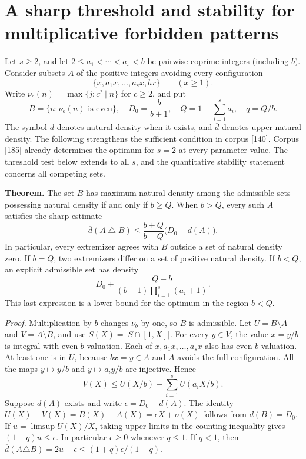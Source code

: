 \documentclass[11pt]{article}
\begin{document}
\clearpage

\section{A sharp threshold and stability for multiplicative forbidden patterns}
Let $s\ge2$, and let $2\le a_1<\cdots<a_s<b$ be pairwise coprime integers (including $b$). Consider subsets $A$ of the positive integers avoiding every configuration
\[
 \{x,a_1x,\ldots,a_sx,bx\}\qquad(x\ge1).
\]
Write $\nu_c(n)=\max\{j:c^j\mid n\}$ for $c\ge2$, and put
\[
 B=\{n:\nu_b(n)\text{ is even}\},\quad D_0=\frac{b}{b+1},\quad
 Q=1+\sum_{i=1}^s a_i,\quad q=Q/b.
\]
The symbol $d$ denotes natural density when it exists, and $\overline d$ denotes upper natural density. The following strengthens the sufficient condition in corpus [140]. Corpus [185] already determines the optimum for $s=2$ at every parameter value. The threshold test below extends to all $s$, and the quantitative stability statement concerns all competing sets.
\par\medskip\noindent\textbf{Theorem.}
The set $B$ has maximum natural density among the admissible sets possessing natural density if and only if $b\ge Q$. When $b>Q$, every such $A$ satisfies the sharp estimate
\[
 \overline d(A\mathbin{\triangle}B)\le
 \frac{b+Q}{b-Q}\bigl(D_0-d(A)\bigr).
\]
In particular, every extremizer agrees with $B$ outside a set of natural density zero. If $b=Q$, two extremizers differ on a set of positive natural density. If $b<Q$, an explicit admissible set has density
\[
 D_0+\frac{Q-b}{(b+1)\prod_{i=1}^s(a_i+1)}.
\]
This last expression is a lower bound for the optimum in the region $b<Q$.
\par\medskip\noindent\emph{Proof.}
Multiplication by $b$ changes $\nu_b$ by one, so $B$ is admissible.
Let $U=B\setminus A$ and $V=A\setminus B$, and use $S(X)=|S\cap[1,X]|$.
For every $y\in V$, the value $x=y/b$ is integral with even $b$-valuation. Each of $x,a_1x,\ldots,a_sx$ also has even $b$-valuation. At least one is in $U$, because $bx=y\in A$ and $A$ avoids the full configuration. All the maps $y\mapsto y/b$ and $y\mapsto a_iy/b$ are injective. Hence
\[
 V(X)\le U(X/b)+\sum_{i=1}^s U(a_iX/b).
\]
Suppose $d(A)$ exists and write $\epsilon=D_0-d(A)$. The identity
$U(X)-V(X)=B(X)-A(X)=\epsilon X+o(X)$ follows from $d(B)=D_0$.
If $u=\limsup U(X)/X$, taking upper limits in the counting inequality gives
$(1-q)u\le\epsilon$. In particular $\epsilon\ge0$ whenever $q\le1$.
If $q<1$, then $\overline d(A\triangle B)=2u-\epsilon\le(1+q)\epsilon/(1-q)$.
\end{document}
